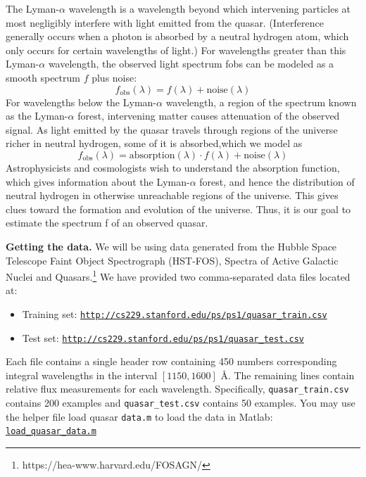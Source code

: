 \documentclass[11pt]{article}
\begin{document}
The Lyman-$\alpha$ wavelength is a wavelength beyond which intervening particles at most negligibly interfere with light emitted from the quasar. (Interference generally occurs when a photon is absorbed by a neutral hydrogen atom, which only occurs for certain wavelengths of light.) For wavelengths greater than this Lyman-$\alpha$ wavelength, the observed light spectrum fobs can be modeled as a smooth spectrum $f$ plus noise:
$$f_{\text{obs}}(\lambda) = f(\lambda)+ \text{noise}(\lambda)$$
For wavelengths below the Lyman-$\alpha$ wavelength, a region of the spectrum known as the Lyman-$\alpha$ forest, intervening matter causes attenuation of the observed signal. As light emitted by the quasar travels through regions of the universe richer in neutral hydrogen, some of it is absorbed,which we model as
$$f_\text{obs}(\lambda) = \text{absorption}(\lambda) \cdot f(\lambda) + \text{noise}(\lambda)$$
Astrophysicists and cosmologists wish to understand the absorption function, which gives information about the Lyman-$\alpha$ forest, and hence the distribution of neutral hydrogen in otherwise unreachable regions of the universe. This gives clues toward the formation and evolution of the universe. Thus, it is our goal to estimate the spectrum f of an observed quasar.

\textbf{Getting the data.} We will be using data generated from the Hubble Space Telescope Faint Object Spectrograph (HST-FOS), Spectra of Active Galactic Nuclei and Quasars.\footnote{https://hea-www.harvard.edu/FOSAGN/} We have provided two comma-separated data files located at:
\begin{itemize}
\item Training set: \href{http://cs229.stanford.edu/ps/ps1/quasar_train.csv}{\texttt{http://cs229.stanford.edu/ps/ps1/quasar\_train.csv}}
\item Test set:  \href{http://cs229.stanford.edu/ps/ps1/quasar_test.csv}{\texttt{http://cs229.stanford.edu/ps/ps1/quasar\_test.csv}}
\end{itemize}

Each file contains a single header row containing 450 numbers corresponding integral wavelengths in the interval $[1150, 1600]$ \AA. The remaining lines contain relative flux measurements for each wavelength. Specifically, \texttt{quasar\_train.csv} contains 200 examples and \texttt{quasar\_test.csv} contains 50 examples. You may use the helper file load quasar \texttt{data.m} to load the data in Matlab: \href{http://cs229.stanford.edu/ps/ps1/load_quasar_data.m}{\texttt{load\_quasar\_data.m}}
\end{document}
